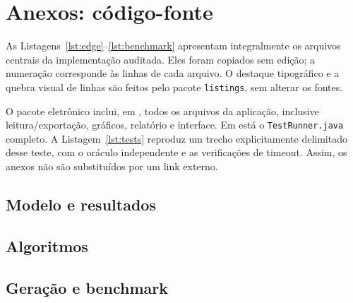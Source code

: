 \section{Anexos: código-fonte}
\label{app:source}

As Listagens~\ref{lst:edge}--\ref{lst:benchmark} apresentam
integralmente os arquivos centrais da implementação auditada.
Eles foram copiados sem edição; a numeração corresponde às
linhas de cada arquivo. O destaque tipográfico e a quebra
visual de linhas são feitos pelo pacote \texttt{listings},
sem alterar os fontes.

O pacote eletrônico inclui, em , todos
os arquivos da aplicação, inclusive leitura/exportação,
gráficos, relatório e interface. Em 
está o \texttt{TestRunner.java} completo. A
Listagem~\ref{lst:tests} reproduz um trecho explicitamente
delimitado desse teste, com o oráculo independente e as
verificações de timeout. Assim, os anexos não são
substituídos por um link externo.

\subsection{Modelo e resultados}






\subsection{Algoritmos}




\subsection{Geração e benchmark}

